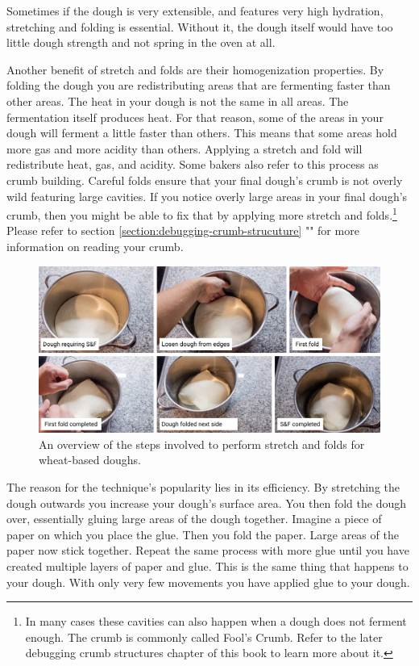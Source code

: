 Sometimes if the dough is very extensible,
and features very high hydration, stretching and folding is essential.
Without it, the dough itself would have too little dough strength and not
spring in the oven at all.

Another benefit of stretch and folds are their homogenization properties. By
folding the dough you are redistributing areas that are fermenting faster
than other areas. The heat in your dough is not the same in all areas.
The fermentation itself produces heat. For that reason, some of the areas in
your dough will ferment a little faster than others. This means that some
areas hold more gas and more acidity than others. Applying a stretch and fold
will redistribute heat, gas, and acidity. Some bakers also refer to this
process as crumb building. Careful folds ensure that your final dough's crumb
is not overly wild featuring large cavities. If you notice overly
large areas in your final dough's crumb, then you might be able to fix that
by applying more stretch and folds.\footnote{In many cases these cavities can
also happen when a dough does not ferment enough. The crumb is commonly called
Fool's Crumb. Refer to the later debugging crumb structures chapter of this
book to learn more about it.} Please refer to section \ref{section:debugging-crumb-strucuture}
"" for more information on reading
your crumb.

\begin{figure}[!htb]
  \includegraphics[width=\textwidth]{stretch-and-fold-steps}
  \caption{An overview of the steps involved to perform stretch and folds
  for wheat-based doughs.}
  \label{figure:stretch-and-fold-steps}
\end{figure}

The reason for the technique's popularity lies in its efficiency. By stretching
the dough outwards you increase your dough's surface area. You then fold the
dough over, essentially gluing large areas of the dough together. Imagine a
piece of paper on which you place the glue. Then you fold the paper. Large areas
of the paper now stick together. Repeat the same process with more glue until
you have created multiple layers of paper and glue. This is the same thing that
happens to your dough. With only very few movements you have applied glue to your
dough.

